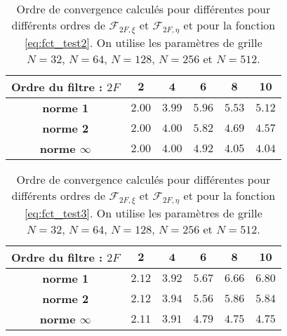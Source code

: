 \begin{table}[htbp]
\begin{center}
\begin{tabular}{|c||c|c|c|c|c|}
\hline
\textbf{Ordre du filtre :} $2F$ & $\mathbf{2}$ & $\mathbf{4}$ & $\mathbf{6}$ & $\mathbf{8}$ & $\mathbf{10}$ \\
\hline
\hline
\textbf{norme 1}& $2.00$ & $3.99$ & $5.96$ & $5.53$ & $5.12$\\
\textbf{norme 2} & $2.00$ & $4.00$ & $5.82$ & $4.69$ & $4.57$\\
\textbf{norme $\infty$} & $2.00$ & $4.00$ & $4.92$ & $4.05$ & $4.04$\\
\hline
\end{tabular}
\end{center}
\caption{Ordre de convergence calculés pour différentes pour différents ordres de $\mathcal{F}_{2F,\xi}$ et $\mathcal{F}_{2F,\eta}$ et pour la fonction \eqref{eq:fct_test2}. On utilise les paramètres de grille $N=32$, $N=64$, $N=128$, $N=256$ et $N=512$.}
\label{tab:rate_fct2}
\end{table} 

\begin{table}[htbp]
\begin{center}
\begin{tabular}{|c||c|c|c|c|c|}
\hline
\textbf{Ordre du filtre :} $2F$ & $\mathbf{2}$ & $\mathbf{4}$ & $\mathbf{6}$ & $\mathbf{8}$ & $\mathbf{10}$ \\
\hline
\hline
\textbf{norme 1} & $2.12$ & $3.92$ & $5.67$ & $6.66$ & $6.80$\\
\textbf{norme 2} & $2.12$ & $3.94$ & $5.56$ & $5.86$ & $5.84$\\
\textbf{norme $\infty$} & $2.11$ & $3.91$ & $4.79$ & $4.75$ & $4.75$\\
\hline
\end{tabular}
\end{center}
\caption{Ordre de convergence calculés pour différentes pour différents ordres de $\mathcal{F}_{2F,\xi}$ et $\mathcal{F}_{2F,\eta}$ et pour la fonction \eqref{eq:fct_test3}. On utilise les paramètres de grille $N=32$, $N=64$, $N=128$, $N=256$ et $N=512$.}
\label{tab:rate_fct3}
\end{table} 




















